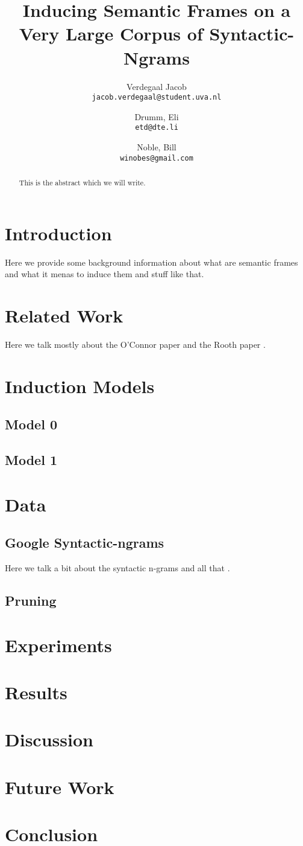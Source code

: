 \documentclass[11pt,twocolumn]{scrartcl}
\author{
    Verdegaal Jacob \\
    \texttt{jacob.verdegaal@student.uva.nl}
    \and
    Drumm, Eli\\
    \texttt{etd@dte.li}
    \and
    Noble, Bill\\
    \texttt{winobes@gmail.com}
}
\title{Inducing Semantic Frames on a Very Large Corpus of Syntactic-Ngrams}
\begin{document}
\maketitle

\begin{abstract}
This is the abstract which we will write.
\end{abstract}

\section{Introduction}
Here we provide some background information about what are semantic frames and 
what it menas to induce them and stuff like that.

\section{Related Work}
Here we talk mostly about the O'Connor paper \cite{oconnor2013} and the Rooth 
paper \cite{rooth1999}.

\section{Induction Models}
\subsection{Model 0}
\subsection{Model 1}

\section{Data}
\subsection{Google Syntactic-ngrams}
Here we talk a bit about the syntactic n-grams and all that \cite{ngrams2013}.
\subsection{Pruning}

\section{Experiments}

\section{Results}

\section{Discussion}

\section{Future Work}

\section{Conclusion}


\end{document}

